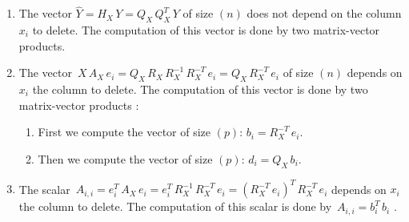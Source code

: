 \begin{enumerate}
\item The vector $\hat{Y}=H_X\,Y=Q_X\,Q_X^T\,Y $ of size $(n)$ does not depend on the column $x_i$ to delete.
The computation of this vector is done by two matrix-vector products. 
\item The vector $\,X\, A_X\,e_i=Q_X\,R_X\,R_X^{-1}\,R_X^{-T}\,e_i = Q_X\,R_X^{-T}\,e_i $ of size $(n)$ depends on $x_i$ the column to delete.
The computation of this vector is done by two matrix-vector products :
\begin{enumerate}
\item First we compute the vector of size $(p)$: $b_i=R_X^{-T}\,e_i$.
\item Then we compute the vector of size $(p)$: $d_i=Q_X\,b_i$.
\end{enumerate}
\item The scalar $\,A_{i,i}=e_i^T\,A_X\,e_i =e_i^T\,R_X^{-1}\,R_X^{-T}\,e_i = (R_X^{-T}\,e_i)^T \,R_X^{-T}\,e_i$ depends on $x_i$ the column to delete.
The computation of this scalar is done by $\,A_{i,i}=b_i^T\,b_i$ .
\end{enumerate}


\newpage
